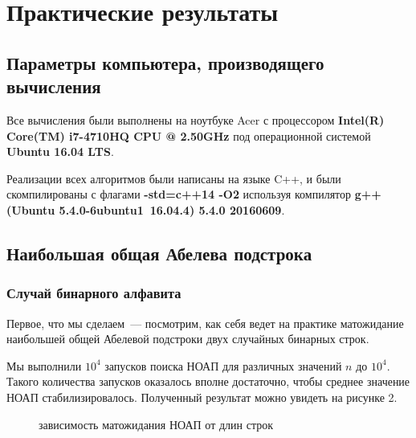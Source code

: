 \chapter{Практические результаты}
\section{Параметры компьютера, производящего вычисления}
Все вычисления были выполнены на ноутбуке Acer с процессором \textbf{Intel(R) Core(TM) i7-4710HQ CPU @ 2.50GHz} под операционной системой \textbf{Ubuntu 16.04 LTS}.

Реализации всех алгоритмов были написаны на языке C++, и были скомпилированы с флагами \textbf{-std=c++14 -O2} используя компилятор \textbf{g++ (Ubuntu 5.4.0-6ubuntu1~16.04.4) 5.4.0 20160609}.

\section{Наибольшая общая Абелева подстрока}
\subsection{Случай бинарного алфавита}

Первое, что мы сделаем~--- посмотрим, как себя ведет на практике матожидание наибольшей общей Абелевой подстроки двух случайных бинарных строк. 

Мы выполнили $10^4$ запусков поиска НОАП для различных значений $n$ до $10^4$. Такого количества запусков оказалось вполне достаточно, чтобы среднее значение НОАП стабилизировалось. Полученный результат можно увидеть на рисунке 2.

\begin{figure}[h]
\caption{зависимость матожидания НОАП от длин строк}
\end{figure}

